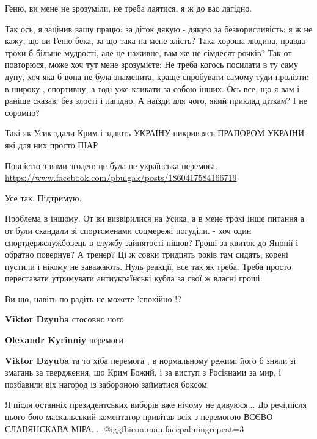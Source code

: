 \begin{itemize}
\begin{itemize}
Геню, ви мене не зрозуміли, не треба лаятися, я ж до вас лагідно.

Так ось, я зацінив вашу працю: за діток дякую - дякую за безкорисливість; я ж
не кажу, що ви Геню бека, за що така на мене злість? Така хороша людина, правда
трохи б більше мудрості, але це наживне, вам же не сімдесят рочків? Так от
повторюся, може хоч тут мене зрозумієте: Не треба когось посилати в ту саму
дупу, хоч яка б вона не була знаменита, краще спробувати самому туди пролізти:
в широку , спортивну, а тоді уже кликати за собою інших. Ось все, що я вам і
раніше сказав: без злості і лагідно. А наїзди для чого, який приклад діткам? І
не соромно?

\end{itemize} %

Такі як Усик здали Крим і здають УКРАЇНУ пикриваясь ПРАПОРОМ УКРАЇНИ які для
них просто ПІАР


Повністю з вами згоден: це була не українська перемога.
\url{https://www.facebook.com/pbulgak/posts/1860417584166719}

Усе так. Підтримую.


Проблема в іншому. От ви визвірилися на Усика, а в мене трохі інше питання а от
були скандали зі спортсменами соцмережі погуділи. - хоч один
спортдержслужбовець в службу зайнятості пішов? Гроші за квиток до Японії і
обратно повернув? А тренер? Ці ж совки тридцять років там сидять, корені
пустили і нікому не заважають. Нуль реакції, все так як треба. Треба просто
переставати утримувати антиукраїнські кубла за свої ж власні гроші.

Ви що, навіть по радіть не можете 'спокійно'!?

\begin{itemize} %
\textbf{Viktor Dzyuba} стосовно чого

\textbf{Olexandr Kyrinniy} перемоги

\textbf{Viktor Dzyuba} та то хіба перемога , в нормальному режимі його б зняли зі змагань за твердження, що Крим Божий, і за виступ з Росіянами за мир, і позбавили віх нагород із забороною займатися боксом
\end{itemize} %

Я після останніх президентських виборів вже нічому не дивуюся...
До речі,після цього бою маскальський коментатор привітав всіх з перемогою ВСЄВО СЛАВЯНСКАВА МІРА.... @igg{fbicon.man.facepalming}{repeat=3} 


\end{itemize}
